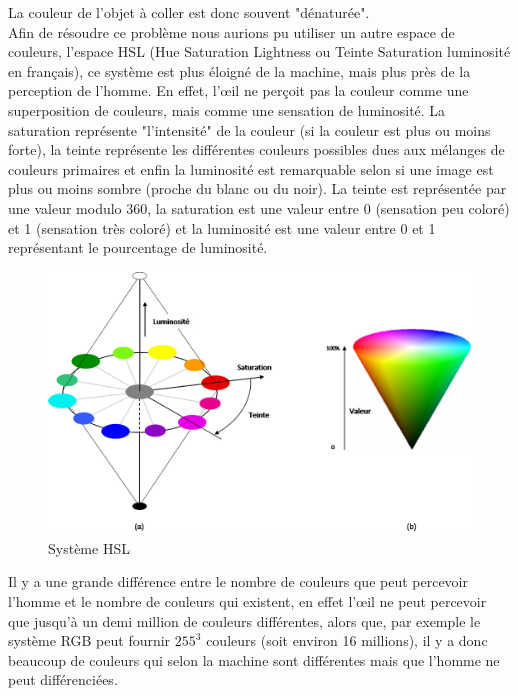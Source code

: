 La couleur de l'objet à coller est donc souvent "dénaturée".\\
Afin de résoudre ce problème nous aurions pu utiliser un autre espace de couleurs, l'espace HSL (Hue Saturation Lightness ou Teinte Saturation luminosité en français), ce système est plus éloigné de la machine, mais plus près de la perception de l'homme. En effet, l'œil ne perçoit pas la couleur comme une superposition de couleurs, mais comme une sensation de luminosité. La saturation représente "l'intensité" de la couleur (si la couleur est plus ou moins forte), la teinte représente les différentes couleurs possibles dues aux mélanges de couleurs primaires et enfin la luminosité est remarquable selon si une image est plus ou moins sombre (proche du blanc ou du noir). La teinte est représentée par une valeur modulo 360, la saturation est une valeur entre 0 (sensation peu coloré) et 1 (sensation très coloré) et la luminosité est une valeur entre 0 et 1 représentant le pourcentage de luminosité.
\begin{figure}
\centering
 \includegraphics[scale=0.5]{Images/TSL.png}
 \caption{Système HSL}
\end{figure}
 
 Il y a une grande différence entre le nombre de couleurs que peut percevoir l'homme et le nombre de couleurs qui existent, en effet l'œil ne peut percevoir que jusqu'à un demi million de couleurs différentes, alors que, par exemple le système RGB peut fournir $255^3$ couleurs (soit environ 16 millions), il y a donc beaucoup de couleurs qui selon la machine sont différentes mais que l'homme ne peut différenciées.
